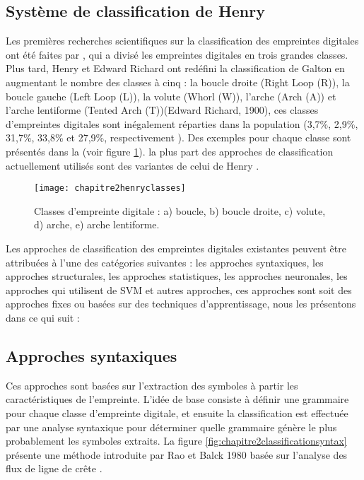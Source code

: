 \subsection{Système de classification de Henry}
Les premières recherches scientifiques sur la classification des empreintes digitales ont été faites par \citep{galton1892finger} , qui a divisé les empreintes digitales en trois grandes classes. Plus tard, Henry et Edward Richard  ont redéfini la classification de Galton en augmentant le nombre des classes à  cinq  \citep{henry1905classification} : la boucle droite (Right Loop (R)), la boucle gauche (Left Loop (L)), la volute (Whorl (W)), l'arche (Arch (A)) et l'arche lentiforme (Tented Arch (T))(Edward Richard, 1900), ces classes d'empreintes digitales sont inégalement réparties dans la population (3,7\%, 2,9\%, 31,7\%, 33,8\% et 27,9\%, respectivement \citep{JIANG2009}). Des exemples pour chaque classe sont présentés dans la (voir figure \ref{fig:chapitre2henryclasses}). la plus part des approches de classification actuellement utilisés sont des variantes de celui de Henry \citep{galar2015survey}. 

\begin{figure}[H]
	\centering
	\texttt{[image: chapitre2henryclasses]}
	\caption{Classes d'empreinte digitale : a) boucle, b) boucle droite, c) volute, d) arche, e) arche lentiforme.}
	\label{fig:chapitre2henryclasses}
\end{figure}

Les approches de classification des empreintes digitales existantes peuvent être attribuées à l'une des catégories suivantes : les approches syntaxiques, les approches structurales, les approches statistiques, les approches neuronales, les approches qui utilisent de SVM et autres approches, ces approches sont soit des approches fixes ou basées sur des techniques d'apprentissage, nous les présentons dans ce qui suit :
\subsection{Approches syntaxiques}
Ces approches sont basées sur l'extraction des symboles à partir les caractéristiques de l'empreinte. L'idée de base consiste à définir une grammaire pour chaque classe d'empreinte digitale, et ensuite la classification est effectuée par une analyse syntaxique pour déterminer quelle grammaire génère le plus probablement les symboles extraits\citep{mridula2014review}. La figure \ref{fig:chapitre2classificationsyntax} présente une méthode introduite par Rao et Balck 1980 basée sur l'analyse des flux de ligne de crête \citep{karu1996fingerprint}.


